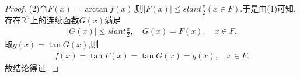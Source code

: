 \documentclass[../../main.tex]{subfiles}
\begin{document}
\begin{proof}
(2)令\(F(x)=\arctan f(x)\),则$|F(x)|\leqslant slant \frac{\pi}{2}(x\in F)$.于是由(1)可知,存在$\mathbb{R}^n$上的连续函数$G(x)$满足
\begin{align*}
|G(x)|\leqslant slant \frac{\pi}{2},\quad G(x)=F(x),\quad x\in F.
\end{align*}
取$g(x)=\tan G(x)$,则
\begin{align*}
f(x)=\tan F(x)=\tan G(x)=g(x),\quad x\in F.
\end{align*}
故结论得证.
\end{proof}
\end{document}
